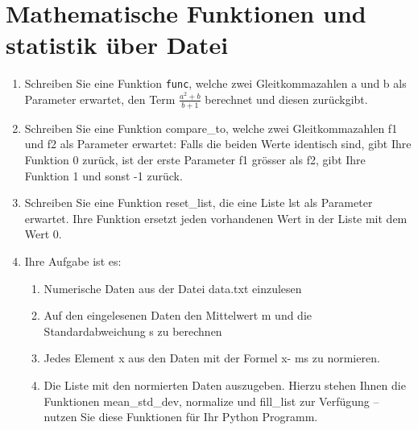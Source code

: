 \documentclass[11pt, oneside]{book}
\begin{document}
\section{Mathematische Funktionen und statistik über Datei}

\begin{enumerate}[label=(\alph*)]
    \item Schreiben Sie eine Funktion \texttt{func}, welche zwei Gleitkommazahlen a und b als Parameter erwartet, den Term $\frac{a^2 + b}{b + 1}$ berechnet und diesen zurückgibt.
    \item Schreiben Sie eine Funktion compare\_to, welche zwei Gleitkommazahlen f1 und f2 als Parameter erwartet: Falls die beiden Werte identisch sind, gibt Ihre Funktion 0 zurück, ist der erste Parameter f1 grösser als f2, gibt Ihre Funktion 1 und sonst -1 zurück.
    \item Schreiben Sie eine Funktion reset\_list, die eine Liste lst als Parameter erwartet. Ihre Funktion ersetzt jeden vorhandenen Wert in der Liste mit dem Wert 0.
    \item Ihre Aufgabe ist es:
    \begin{enumerate}[label=(\alph*)]
        \item Numerische Daten aus der Datei data.txt einzulesen
        \item Auf den eingelesenen Daten den Mittelwert m und die Standardabweichung s zu berechnen
        \item Jedes Element x aus den Daten mit der Formel x- ms zu normieren.
        \item Die Liste mit den normierten Daten auszugeben. \newline
        Hierzu stehen Ihnen die Funktionen mean\_std\_dev, normalize und fill\_list zur Verfügung – nutzen Sie diese Funktionen für Ihr Python Programm.
    \end{enumerate}
\end{enumerate}
\end{document}
